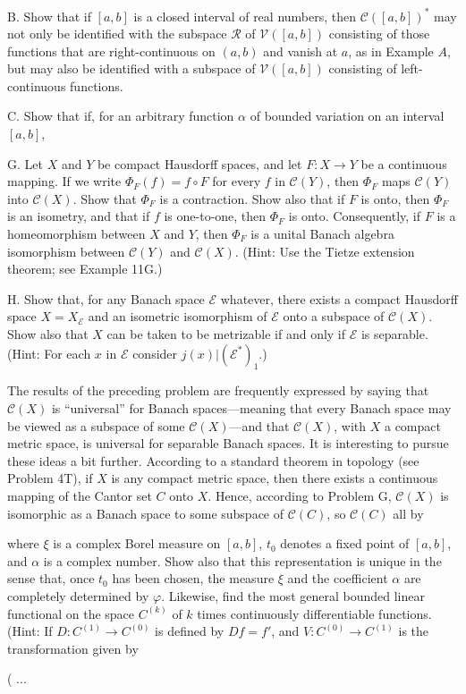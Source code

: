 B. Show that if $[a, b]$ is a closed interval of real numbers, then $\mathcal{C}([a, b])^*$ may not only be identified with the subspace $\mathcal{R}$ of $\mathcal{V}([a, b])$ consisting of those functions that are right-continuous on $(a, b)$ and vanish at $a$, as in Example $A$, but may also be identified with a subspace of $\mathcal{V}([a, b])$ consisting of left-continuous functions.

C. Show that if, for an arbitrary function $\alpha$ of bounded variation on an interval $[a, b]$,

G. Let $X$ and $Y$ be compact Hausdorff spaces, and let $F: X \rightarrow Y$ be a continuous mapping. If we write $\Phi_F(f) = f \circ F$ for every $f$ in $\mathcal{C}(Y)$, then $\Phi_F$ maps $\mathcal{C}(Y)$ into $\mathcal{C}(X)$. Show that $\Phi_F$ is a contraction. Show also that if $F$ is onto, then $\Phi_F$ is an isometry, and that if $f$ is one-to-one, then $\Phi_F$ is onto. Consequently, if $F$ is a homeomorphism between $X$ and $Y$, then $\Phi_F$ is a unital Banach algebra isomorphism between $\mathcal{C}(Y)$ and $\mathcal{C}(X)$. (Hint: Use the Tietze extension theorem; see Example 11G.)

H. Show that, for any Banach space $\mathcal{E}$ whatever, there exists a compact Hausdorff space $X = X_\mathcal{E}$ and an isometric isomorphism of $\mathcal{E}$ onto a subspace of $\mathcal{C}(X)$. Show also that $X$ can be taken to be metrizable if and only if $\mathcal{E}$ is separable. (Hint: For each $x$ in $\mathcal{E}$ consider $j(x)|(\mathcal{E}^*)_1$.)

The results of the preceding problem are frequently expressed by saying that $\mathcal{C}(X)$ is “universal” for Banach spaces—meaning that every Banach space may be viewed as a subspace of some $\mathcal{C}(X)$—and that $\mathcal{C}(X)$, with $X$ a compact metric space, is universal for separable Banach spaces. It is interesting to pursue these ideas a bit further. According to a standard theorem in topology (see Problem 4T), if $X$ is any compact metric space, then there exists a continuous mapping of the Cantor set $C$ onto $X$. Hence, according to Problem G, $\mathcal{C}(X)$ is isomorphic as a Banach space to some subspace of $\mathcal{C}(C)$, so $\mathcal{C}(C)$ all by

where $\xi$ is a complex Borel measure on $[a, b]$, $t_0$ denotes a fixed point of $[a, b]$, and $\alpha$ is a complex number. Show also that this representation is unique in the sense that, once $t_0$ has been chosen, the measure $\xi$ and the coefficient $\alpha$ are completely determined by $\varphi$. Likewise, find the most general bounded linear functional on the space $C^{(k)}$ of $k$ times continuously differentiable functions. (Hint: If $D: C^{(1)} \rightarrow C^{(0)}$ is defined by $Df = f'$, and $V: C^{(0)} \rightarrow C^{(1)}$ is the transformation given by

$$(
...
